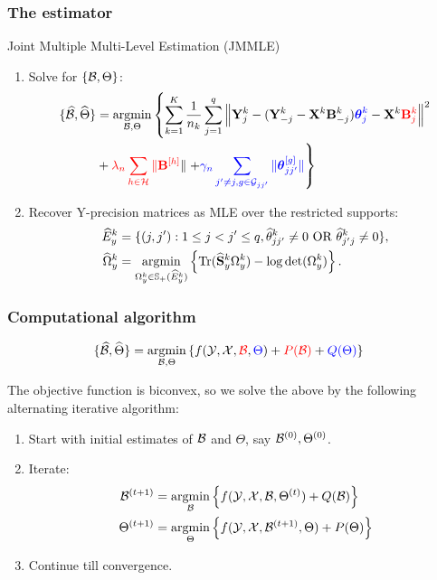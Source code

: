\documentclass[10pt]{beamer}
\theoremstyle{definition}
\DeclareMathOperator*{\Tr}{Tr}
\DeclareMathOperator*{\argmin}{argmin}
\begin{document}

\begin{frame}
\frametitle{The estimator}

\begin{center}
{\colrbf Joint Multiple Multi-Level Estimation (JMMLE)}
\end{center}

\begin{enumerate}
\item Solve for $\{ {\cal{B}}, \Theta\}$:
%
\begin{align*}
\{ \widehat \cB, \widehat \Theta \} &=
\argmin_{\cB, \Theta} \left\{ \sum_{k=1}^K \frac{1}{n_k} \sum_{j=1}^q
\left\| \bfY_j^k - ( \bfY_{-j}^k - \bfX^k \bfB_{-j}^k) {\colb \bftheta_j^k}
- \bfX^k {\colr \bfB_j^k} \right\|^2 \right.\\
& + {\colr \lambda_n \sum_{h \in \cH} \| \bfB^{[h]}} \|
\left. + {\colb \gamma_n  \sum_{j' \neq j, g \in \cG_{jj'}} \| \bftheta_{jj'}^{[g]} \|} \right\}
\end{align*}

\item Recover Y-precision matrices as MLE over the restricted supports: %
%
\begin{align*}
\widehat E_y^k &= \{(j,j'): 1 \leq j < j' \leq q, \widehat \theta_{jj'}^k \neq 0 \text{ OR } \widehat \theta_{j'j}^k \neq 0 \},\\
\widehat \Omega_y^k &= \argmin_{\Omega_y^k \in \BS_+ (\widehat E_y^k)}
\left\{ \Tr (\widehat \bfS_y^k \Omega_y^k ) - \log \det (\Omega_y^k) \right\}.
\end{align*}
%
\end{enumerate}

\end{frame}
\begin{frame}
\frametitle{Computational algorithm}
\begin{align*}
\{ \widehat \cB, \widehat \Theta \} &= \argmin_{\cB, \Theta}
\left\{ f(\cY, \cX, {\colr \cB}, {\colb \Theta}) + {\colr P(\cB)} + {\colb Q(\Theta)} \right\}
\end{align*}

The objective function is biconvex, so we solve the above by the following alternating iterative algorithm:

\begin{enumerate}
\item Start with initial estimates of ${\cal{B}}$ and $\Theta$, say ${\cal{B}}^{(0)}, \Theta^{(0)}$.
\item Iterate:
%
\begin{align*}
\cB^{(t+1)} &= \argmin_\cB \left\{ f ( \cY, \cX, \cB, \Theta^{(t)}) + Q (\cB) \right\}\\
\Theta^{(t+1)} &= \argmin_\Theta \left\{ f ( \cY, \cX, \cB^{(t+1)}, \Theta) + P (\Theta) \right\}
\end{align*}
\item Continue till convergence.
\end{enumerate}
\end{frame}
\end{document}
